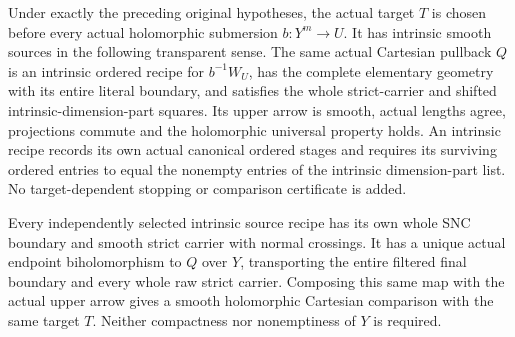 \begin{theorem}
\label{hir:original-local-nonpure-natural-smooth-sources}
\leanok
Under exactly the preceding original hypotheses, the actual target
$T$ is chosen before every actual holomorphic submersion $b:Y^m\to U$.
It has intrinsic smooth sources in the following transparent sense.
The same actual Cartesian pullback $Q$ is an intrinsic ordered recipe
for $b^{-1}W_U$, has the complete elementary geometry with its entire
literal boundary, and satisfies the whole strict-carrier and shifted
intrinsic-dimension-part squares. Its upper arrow is smooth, actual
lengths agree, projections commute and the holomorphic universal
property holds. An intrinsic recipe records its own actual canonical ordered stages
and requires its surviving ordered entries to equal the nonempty
entries of the intrinsic dimension-part list. No target-dependent
stopping or comparison certificate is added.

Every independently selected intrinsic source recipe has its own
whole SNC boundary and smooth strict carrier with normal crossings.
It has a unique actual endpoint biholomorphism to $Q$ over $Y$,
transporting the entire filtered final boundary and every whole raw
strict carrier. Composing this same map with the actual upper arrow
gives a smooth holomorphic Cartesian comparison with the same target
$T$. Neither compactness nor nonemptiness of $Y$ is required.
\end{theorem}
